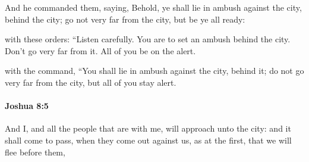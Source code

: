 			\begin{versebox}
					\item[BHS] 
					\item[ASV] And he commanded them, saying, Behold, ye shall lie in ambush against the city, behind the city; go not very far from the city, but be ye all ready:
					\item[NIV] with these orders: “Listen carefully. You are to set an ambush behind the city. Don’t go very far from it. All of you be on the alert.
					\item[NRSV] with the command, “You shall lie in ambush against the city, behind it; do not go very far from the city, but all of you stay alert.
			\end{versebox}

		\paragraph{Joshua 8:5} %
			\label{JOSHUA-8-5}

			And I, and all the people that are with me, will approach unto the city: and it shall come to pass, when they come out against us, as at the first, that we will flee before them,

